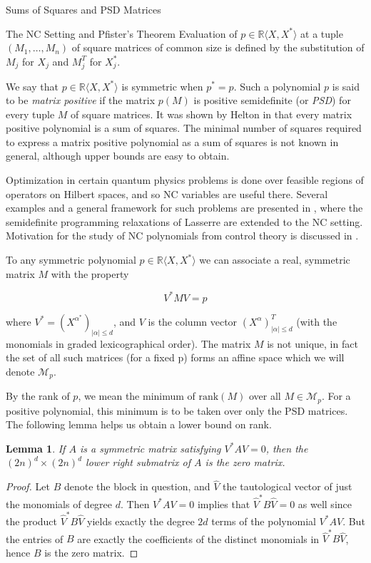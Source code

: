 \documentclass[12pt,oneside,final]{ucthesisucsbmath2010}
\newcommand{\R}{\mathbb{R}}
\newtheorem{lem}[thm]{Lemma}
\theoremstyle{definition}
\begin{document}
\begin{chapter}{Sums of Squares and PSD Matrices}
\begin{section}{The NC Setting and Pfister's Theorem}
Evaluation of $p \in \R\langle X, X^* \rangle$ at a tuple $(M_1, \ldots, M_n)$ of square matrices of common size is defined by the substitution of $M_j$ for $X_j$ and $M_j^T$ for $X_j^*$.

We say that $p \in \R\langle X, X^* \rangle$ is symmetric when $p^*=p$.  Such a polynomial $p$ is said to be \emph{matrix positive} if the matrix $p(M)$ is positive semidefinite (or \emph{PSD}) for every tuple $M$ of square matrices.  It was shown by Helton in \cite{HE} that every matrix positive polynomial is a sum of squares.  The minimal number of squares required to express a matrix positive polynomial as a sum of squares is not known in general, although upper bounds are easy to obtain.  

Optimization in certain quantum physics problems is done over feasible regions of operators on Hilbert spaces, and so NC variables are useful there. Several examples and a general framework for such problems are presented in \cite{PIR}, where the semidefinite programming relaxations of Lasserre are extended to the NC setting. Motivation for the study of NC polynomials from control theory is discussed in \cite{HE2}.

To any symmetric polynomial $p \in \R\langle X, X^* \rangle$ we can associate a real, symmetric matrix $M$ with the property

\[ V^*MV=p\]

where $V^*=(X^{\alpha^*})_{|\alpha|\leq d}$, and $V$ is the column vector $(X^{\alpha})_{|\alpha|\leq d}^T$ (with the monomials in graded lexicographical order). The matrix $M$ is not unique, in fact the set of all such matrices (for a fixed p) forms an affine space which we will denote $\mathcal M_p$.

By the rank of $p$, we mean the minimum of $\text{rank}(M)$ over all $M\in \mathcal {M}_p$.  For a positive polynomial, this minimum is to be taken over only the PSD matrices.  The following lemma helps us obtain a lower bound on rank.

\begin{lem}
If $A$ is a symmetric matrix satisfying $V^*AV=0$, then the $(2n)^d\times (2n)^d$ lower right submatrix of $A$ is the zero matrix.
\end{lem}

\begin{proof} Let $B$ denote the block in question, and $\hat V$ the tautological vector of just the monomials of degree $d$. Then $V^*AV=0$ implies that $\hat V^* B \hat V=0$ as well since the product $\hat V^* B \hat V$ yields exactly the degree $2d$ terms of the polynomial $V^*AV$. But the entries of $B$ are exactly the coefficients of the distinct monomials in $\hat V^*B\hat V$, hence $B$ is the zero matrix.\end{proof}


\end{section}
\end{chapter}
\end{document}
